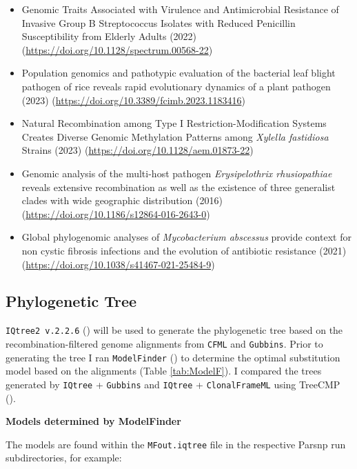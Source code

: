 \documentclass[
]{book}
\providecommand{\tightlist}{%
  \setlength{\itemsep}{0pt}\setlength{\parskip}{0pt}}
\begin{document}
\begin{itemize}
  \begin{itemize}
  \tightlist
  \item
    Genomic Traits Associated with Virulence and Antimicrobial Resistance of Invasive Group B Streptococcus Isolates with Reduced Penicillin Susceptibility from Elderly Adults (2022) (\url{https://doi.org/10.1128/spectrum.00568-22})
  \item
    Population genomics and pathotypic evaluation of the bacterial leaf blight pathogen of rice reveals rapid evolutionary dynamics of a plant pathogen (2023) (\url{https://doi.org/10.3389/fcimb.2023.1183416})
  \item
    Natural Recombination among Type I Restriction-Modification Systems Creates Diverse Genomic Methylation Patterns among \emph{Xylella fastidiosa} Strains (2023) (\url{https://doi.org/10.1128/aem.01873-22})
  \item
    Genomic analysis of the multi-host pathogen \emph{Erysipelothrix rhusiopathiae} reveals extensive recombination as well as the existence of three generalist clades with wide geographic distribution (2016) (\url{https://doi.org/10.1186/s12864-016-2643-0})
  \item
    Global phylogenomic analyses of \emph{Mycobacterium abscessus} provide context for non cystic fibrosis infections and the evolution of antibiotic resistance (2021) (\url{https://doi.org/10.1038/s41467-021-25484-9})
  \end{itemize}
\end{itemize}

\subsection{Phylogenetic Tree}\label{phylogenetic-tree}

\texttt{IQtree2\ v.2.2.6} (\citet{Minh2020}) will be used to generate the phylogenetic tree based on the recombination-filtered genome alignments from \texttt{CFML} and \texttt{Gubbins}. Prior to generating the tree I ran \texttt{ModelFinder} (\citet{Kalyaanamoorthy2017}) to determine the optimal substitution model based on the alignments (Table \ref{tab:ModelF}). I compared the trees generated by \texttt{IQtree} + \texttt{Gubbins} and \texttt{IQtree} + \texttt{ClonalFrameML} using TreeCMP (\citet{goluch2020}).

\textbf{Models determined by ModelFinder}

The models are found within the \texttt{MFout.iqtree} file in the respective Parsnp run subdirectories, for example:
\end{document}
